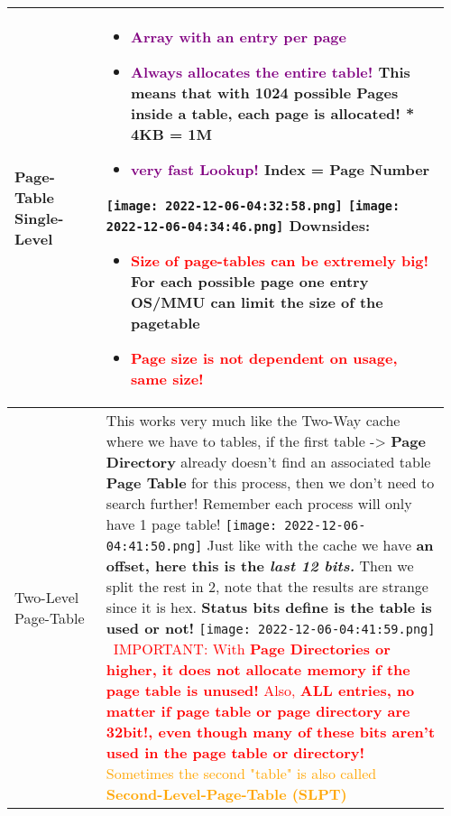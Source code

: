 \documentclass[main.tex,fontsize=8pt,paper=a4,paper=portrait,DIV=calc,]{scrartcl}
\begin{document}
\pagebreak
\begin{table}[ht!]
\begin{tabular}{|m{0.2\linewidth}|m{0.755\linewidth}|}
\hline
Page-Table Single-Level & 
\begin{itemize}
\item \textcolor{purple}{Array with an entry per page}\newline
\item \textcolor{purple}{\textbf{Always allocates the entire table!}}\newline
  This means that with 1024 possible Pages inside a table, each page is allocated!\newline
  1024 * 4KB = 1M
\item \textcolor{purple}{very fast Lookup!}\newline
  Index = Page Number
\end{itemize} 
\texttt{[image: 2022-12-06-04:32:58.png]}\newline 
\texttt{[image: 2022-12-06-04:34:46.png]}\newline
Downsides: \newline
\begin{itemize}
\item \textcolor{red}{Size of page-tables can be extremely big!}\newline
  For each possible page \textbf{one entry}\newline
  OS/MMU can limit the size of the pagetable
\item \textcolor{red}{Page size is not dependent on usage, same size!}
\vspace{-3mm}
\end{itemize}\\ 
\hline
Two-Level Page-Table & 
This works very much like the Two-Way cache where we have to tables, if the first table -> \textbf{Page Directory} already doesn't find an associated table \textbf{Page Table} for this process, then we don't need to search further! \newline
Remember each process will only have 1 page table!\newline
\texttt{[image: 2022-12-06-04:41:50.png]}\newline
Just like with the cache we have \textbf{an offset, here this is the \emph{last 12 bits.}}\newline
Then we split the rest in 2, note that the results are strange since it is hex.\newline
\textbf{Status bits define is the table is used or not!}\newline
\texttt{[image: 2022-12-06-04:41:59.png]} 
\, \newline
\textcolor{red}{IMPORTANT: With \textbf{Page Directories or higher, it does not allocate memory if the page table is unused!}
Also, \textbf{ALL entries, no matter if page table or page directory are 32bit!, even though many of these bits aren't used in the page table or directory!}}\newline
\textcolor{orange}{Sometimes the second "table" is also called \textbf{Second-Level-Page-Table (SLPT)}}\\
\hline
\end{tabular} 
\end{table}
\end{document}
